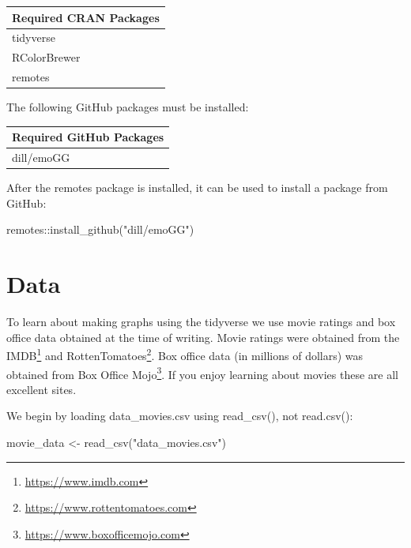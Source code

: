 \documentclass[
]{krantz}
\makeatletter
\newenvironment{Shaded}{\begin{snugshade}}{\end{snugshade}}
\newcommand{\FunctionTok}[1]{\textcolor[rgb]{0,0,0}{#1}}
\newcommand{\NormalTok}[1]{#1}
\newcommand{\OtherTok}[1]{\textcolor[rgb]{0.37,0.37,0.37}{#1}}
\newcommand{\SpecialCharTok}[1]{\textcolor[rgb]{0,0,0}{#1}}
\newcommand{\StringTok}[1]{\textcolor[rgb]{0.5,0.5,0.5}{#1}}
\renewcommand{\href}[2]{#2\footnote{\url{#1}}}
\newenvironment{kframe}{%
\medskip{}
\setlength{\fboxsep}{.8em}
 \def\at@end@of@kframe{}%
 \ifinner\ifhmode%
  \def\at@end@of@kframe{\end{minipage}}%
  \begin{minipage}{\columnwidth}%
 \fi\fi%
 \def\FrameCommand##1{\hskip\@totalleftmargin \hskip-\fboxsep
 \colorbox{shadecolor}{##1}\hskip-\fboxsep
     \hskip-\linewidth \hskip-\@totalleftmargin \hskip\columnwidth}%
 \MakeFramed {\advance\hsize-\width
   \@totalleftmargin\z@ \linewidth\hsize
   \@setminipage}}%
 {\par\unskip\endMakeFramed%
 \at@end@of@kframe}
\renewenvironment{Shaded}{\begin{kframe}}{\end{kframe}}
\makeatother
\begin{document}
\begin{longtable}[]{@{}l@{}}
\toprule
Required CRAN Packages \\
\midrule
\endhead
tidyverse \\
RColorBrewer \\
remotes \\
\bottomrule
\end{longtable}

The following GitHub packages must be installed:

\begin{longtable}[]{@{}l@{}}
\toprule
Required GitHub Packages \\
\midrule
\endhead
dill/emoGG \\
\bottomrule
\end{longtable}

After the remotes package is installed, it can be used to install a package from GitHub:

\begin{Shaded}
\begin{Highlighting}[]
\NormalTok{remotes}\SpecialCharTok{::}\FunctionTok{install\_github}\NormalTok{(}\StringTok{"dill/emoGG"}\NormalTok{)}
\end{Highlighting}
\end{Shaded}

\hypertarget{data}{%
\section{Data}\label{data}}

To learn about making graphs using the tidyverse we use movie ratings and box office data obtained at the time of writing. Movie ratings were obtained from the \href{https://www.imdb.com}{IMDB} and \href{https://www.rottentomatoes.com}{RottenTomatoes}. Box office data (in millions of dollars) was obtained from \href{https://www.boxofficemojo.com}{Box Office Mojo}. If you enjoy learning about movies these are all excellent sites.

We begin by loading data\_movies.csv using read\_csv(), not read.csv():

\begin{Shaded}
\begin{Highlighting}[]
\NormalTok{movie\_data }\OtherTok{\textless{}{-}} \FunctionTok{read\_csv}\NormalTok{(}\StringTok{"data\_movies.csv"}\NormalTok{)}
\end{Highlighting}
\end{Shaded}
\end{document}
